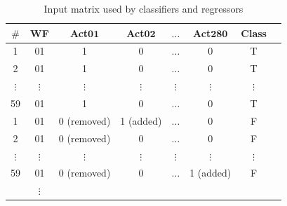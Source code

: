 \documentclass{RITA}
\begin{document}
\begin{table}[!htb]
	\begin{center}
	\caption{Input matrix used by classifiers and regressors}
	\label{tabela_matriz_de_dados_adapatada_classificacao_regressao}
	\begin{tabular}{cccccccc}  \hline
		\textbf{\(\#\)} & \textbf{WF} & \textbf{Act\(\mathbf{01}\)} & \textbf{Act\(\mathbf{02}\)} & \textbf{\(\mathbf{\ldots}\)}  &  \textbf{Act\(\mathbf{280}\)} & \textbf{Class} \\ \hline
		1                 & 01            & 1                               & 0                               & \(\ldots\)                       & 0                                & T                \\ 
		2                 & 01            & 1                               & 0                               & \(\ldots\)                       & 0                                & T                \\ 
		\(\vdots\)        & \(\vdots\)    & \(\vdots\)                      & \(\vdots\)                      & \(\vdots\)                       & \(\vdots\)                       & \(\vdots\)       \\ 
		59                & 01            & 1                               & 0                               & \(\ldots\)                       & 0                                & T                \\ 
		1                 & 01            & 0 (removed)                     & 1 (added)                       & \(\ldots\)                       & 0                                & F                \\ 
		2                 & 01            & 0 (removed)                     & 0                               & \(\ldots\)                       & 0                                & F                \\ 
		\(\vdots\)        & \(\vdots\)    & \(\vdots\)                      & \(\vdots\)                      & \(\vdots\)                       & \(\vdots\)                       & \(\vdots\)       \\ 
		59                & 01            & 0 (removed)                     & 0                               & \(\ldots\)                       & 1 (added)                        & F                \\ 
		& \(\vdots\)    &                                 &                                 &                                  &                                  &                  \\ 

\end{tabular}
\end{center}
\end{table}
\end{document}
